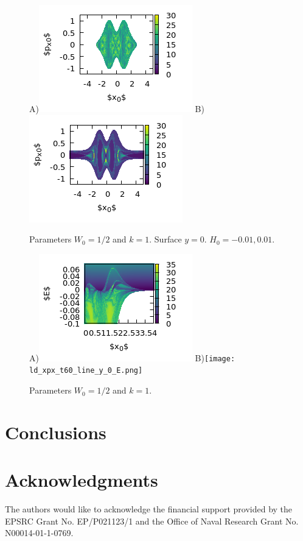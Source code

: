\documentclass[10pt,aps,onecolumn,superscriptaddress]{revtex4-2}
\begin{document}
\begin{figure}[htbp]
	A)\includegraphics[scale=2]{ld_xpx_t50_E-0.01.png}
	B)\includegraphics[scale=2]{ld_xpx_t50_E0.01.png}	
	\caption{Parameters $W_0 = 1/2$ and $k = 1$. Surface $y = 0$. $H_0 =-0.01, 0.01$.  }
	\label{fig:ld_xxxx}
\end{figure}

\begin{figure}[htbp]
	A)\includegraphics[scale=2]{ld_xpx_t60_line_x_0_E.png}
	B)\texttt{[image: ld\_xpx\_t60\_line\_y\_0\_E.png]}
	\caption{Parameters $W_0 = 1/2$ and $k = 1$.   }
	\label{fig:ld_E_xy}
\end{figure}





\section{Conclusions}
\label{sec:conclusion}

\section*{Acknowledgments}
The authors would like to acknowledge the financial support provided by the EPSRC Grant No. EP/P021123/1 and the Office of Naval Research Grant No. N00014-01-1-0769.


\end{document}

